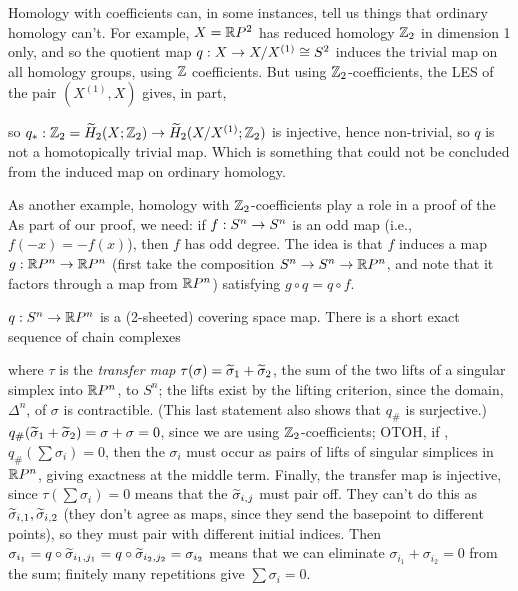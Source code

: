 \msk

Homology with coefficients can, in some instances, tell us things that ordinary homology can't. For example,
$X={\Bbb R} P^2$ has reduced homology ${\Bbb Z}_2$ in dimension 1 only, and so the quotient map 
$q:X\rightarrow X/X^{(1)}\cong S^2$ induces the trivial map on all homology groups, using ${\Bbb Z}$ coefficients. But
using ${\Bbb Z}_2$-coefficients, the LES of the pair $(X^{(1)},X)$ gives, in part,

\ssk


\ssk

so $q_*:{\Bbb Z}_2=\widetilde{H}_2(X;{\Bbb Z}_2)\rightarrow \widetilde{H}_2(X/X^{(1)};{\Bbb Z}_2)$ is injective, hence non-trivial, so $q$ is not
a homotopically trivial map. Which is something that could not be concluded from the induced map on 
ordinary homology.

\vfill
\eject

As another example, homology with ${\Bbb Z}_2$-coefficients play a role in a proof of the
As part of our proof, we need: if $f:S^n\rightarrow S^n$ is an odd map (i.e., $f(-x)=-f(x)$), then $f$ has odd degree.
The idea is that $f$ induces a map $g:{\Bbb R} P^n\rightarrow {\Bbb R} P^n$ (first take the composition $S^n\rightarrow S^n\rightarrow {\Bbb R} P^n$,
and note that it factors through a map from ${\Bbb R} P^n$) satisfying $g\circ q = q\circ f$. 

\ssk

$q:S^n\rightarrow {\Bbb R} P^n$ is a (2-sheeted) covering space map. There is a short exact sequence of chain complexes

\ssk


\ssk

where $\tau$ is the {\it transfer map} $\tau(\sigma) = \widetilde{\sigma}_1+\widetilde{\sigma}_2$, the sum of the two lifts
of a singular simplex into ${\Bbb R} P^n$, to $S^n$; the lifts exist by the lifting criterion,
since the domain, $\Delta^n$, of $\sigma$ is contractible. (This last statement also shows that $q_\#$ is surjective.)
$q_\#(\widetilde{\sigma}_1+\widetilde{\sigma}_2)=\sigma+\sigma=0$, since we are using ${\Bbb Z}_2$-coefficients; OTOH, if ,
$q_\#(\sum \sigma_i)=0$, then the $\sigma_i$ must occur as pairs of lifts of singular simplices in ${\Bbb R} P^n$,
giving exactness at the middle term. Finally, the transfer map is injective, since 
$\tau(\sum\sigma_i)=0$ means that the $\widetilde{\sigma}_{i,j}$ must pair off. They can't do this
as $\widetilde{\sigma}_{i,1},\widetilde{\sigma}_{i,2}$ (they don't agree as maps,
since they send the basepoint to different points), so they must pair with different initial indices. Then
$\sigma_{i_1}=q\circ\widetilde{\sigma}_{i_1,j_1}=q\circ\widetilde{\sigma}_{i_2,j_2}=\sigma_{i_2}$
means that we can eliminate $\sigma_{i_1}+\sigma_{i_2}=0$ from the sum; finitely many repetitions
give $\sum\sigma_i=0$.

